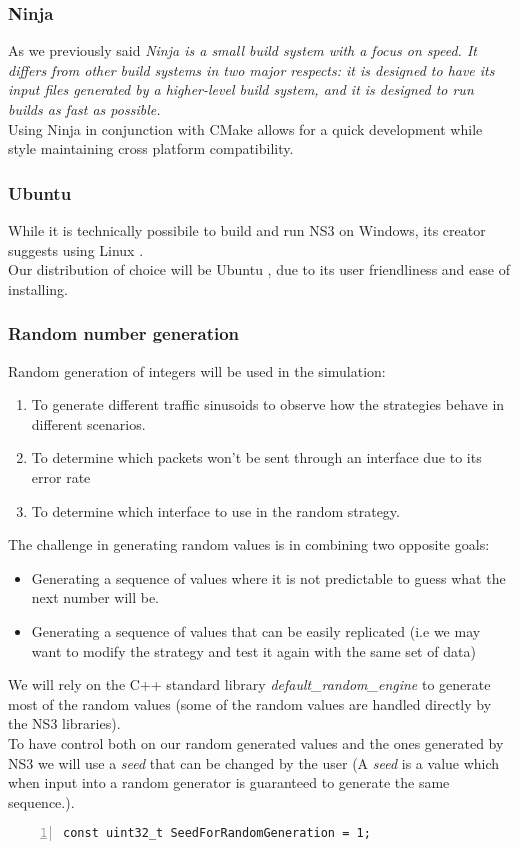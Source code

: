 \subsubsection{Ninja}
As we previously said \textit{Ninja is a small build system with a focus on speed. It differs from other build systems in two major respects: it is designed to have its input files generated by a higher-level build system, and it is designed to run builds as fast as possible.} \cite{ninja}  \\
Using Ninja in conjunction with CMake allows for a quick development while style maintaining cross platform compatibility.

\subsubsection{Ubuntu}
While it is technically possibile to build and run NS3 on Windows, its creator suggests using Linux \cite{ns3-docs} . \\ Our distribution of choice will be Ubuntu  \cite{ubuntu}, due to its user friendliness and ease of installing.


\subsubsection{Random number generation} \label{rng}
Random generation of integers will be used in the simulation:
\begin{enumerate}
	\item To generate different traffic sinusoids to observe how the strategies behave in different scenarios.
	\item To determine which packets won't be sent through an interface due to its error rate
	\item To determine which interface to use in the random strategy.
\end{enumerate}
The challenge in generating random values is in combining two opposite goals:
\begin{itemize}
	\item Generating a sequence of values where it is not predictable to guess what the next number will be.
	\item Generating a sequence of values that can be easily replicated (i.e we may want to modify the strategy and test it again with the same set of data)
\end{itemize}

We will rely on the C++ standard library \textit{default\_random\_engine} \cite{default_random_engine} to generate most of the random values (some of the random values are handled directly by the NS3 libraries). \\
To have control both on our random generated values and the ones generated by NS3 we will use a \textit{seed} that can be changed by the user (A  \textit{seed} is a value which when input into a random generator is guaranteed to generate the same sequence.). \\
\begin{lstlisting}[numbers=left,xleftmargin=2em,frame=single,framexleftmargin=2em, breaklines, tabsize=2, title=Utils.h]
	const uint32_t SeedForRandomGeneration = 1;
\end{lstlisting}

